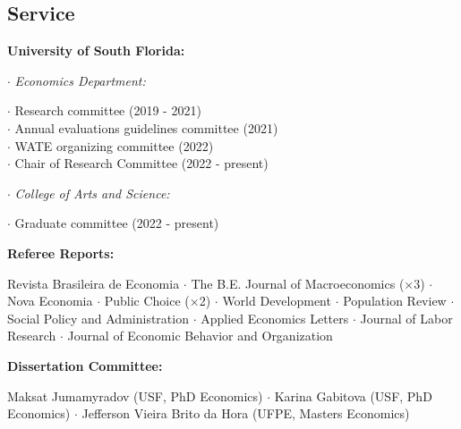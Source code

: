 \documentclass[mm, 10pt]{simple_style}
\begin{document}
\begin{resume}


\section{Service}

\textbf{University of South Florida:} 

$\cdot$ \indent \textit{Economics Department:} \\
\indent \hspace{1cm}  \begin{minipage}[t]{0.75\textwidth}
        $\cdot$ Research committee (2019 - 2021) \\
        $\cdot$ Annual evaluations guidelines committee (2021) \\
        $\cdot$ WATE organizing committee (2022) \\
        $\cdot$ Chair of Research Committee (2022 - present)
        \end{minipage}

$\cdot$ \indent \textit{College of Arts and Science:} \\
\indent \hspace{1cm}  \begin{minipage}[t]{0.75\textwidth}
        $\cdot$ Graduate committee (2022 - present)  \\
        \end{minipage}


\textbf{Referee Reports:} \\
\indent \hspace{1cm}  \begin{minipage}[t]{0.75\textwidth}
Revista Brasileira de Economia 
$\cdot$ The B.E. Journal of Macroeconomics ($\times$3) 
$\cdot$ Nova Economia 
$\cdot$ Public Choice ($\times$2) 
$\cdot$ World Development 
$\cdot$ Population Review 
$\cdot$ Social Policy and Administration 
$\cdot$ Applied Economics Letters 
$\cdot$ Journal of Labor Research
$\cdot$ Journal of Economic Behavior and Organization
\end{minipage}

\textbf{Dissertation Committee:} \\
\indent \hspace{1cm}  \begin{minipage}[t]{0.75\textwidth}
        Maksat Jumamyradov (USF, PhD Economics)
        $\cdot$ Karina Gabitova (USF, PhD Economics)
        $\cdot$ Jefferson Vieira Brito da Hora (UFPE, Masters Economics)
        \end{minipage}        


\end{resume}
\end{document}

